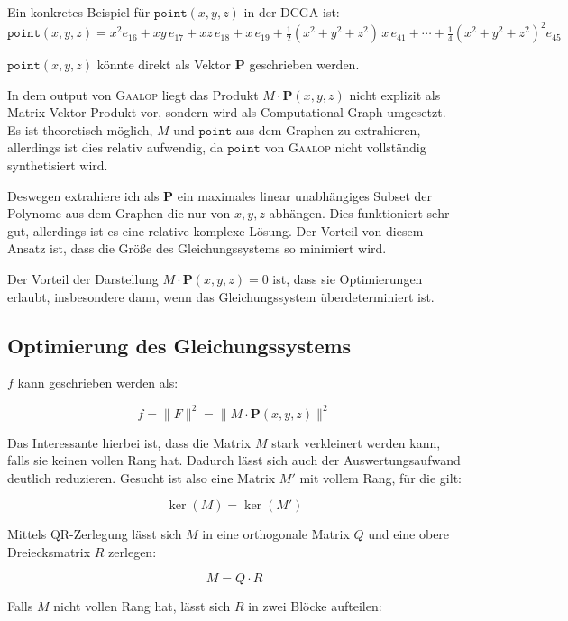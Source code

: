 \documentclass[
	ngerman,%
	accentcolor=9c,%
	ruledheaders=section,%
	class=report,%
	thesis={type=bachelor},%
	fontsize=11pt,%
	parskip=half-,%
	custommargins=true,%
	marginpar=false,%
]{tudapub}
\begin{document}

Ein konkretes Beispiel für \(\texttt{point}(x,y,z)\) in der DCGA ist:
\[
\texttt{point}(x,y,z) = x^2 e_{16} + xy\, e_{17} + xz\, e_{18} + x\, e_{19} + \tfrac{1}{2}(x^2 + y^2 + z^2)\, x\, e_{41} + \cdots + \tfrac{1}{4}(x^2 + y^2 + z^2)^2 e_{45}
\]

$\texttt{point}(x,y,z)$ könnte direkt als Vektor \(\mathbf{P}\) geschrieben werden.


In dem output von \textsc{Gaalop} liegt das Produkt $M \cdot  \mathbf{P}(x,y,z)$ nicht explizit als Matrix-Vektor-Produkt vor, sondern wird als Computational Graph umgesetzt. Es ist theoretisch möglich, $M$ und 
$\texttt{point}$ aus dem Graphen zu extrahieren, allerdings ist dies relativ aufwendig, da $\texttt{point}$ von \textsc{Gaalop} nicht vollständig synthetisiert wird.

Deswegen extrahiere ich als \(\mathbf{P}\) ein maximales linear unabhängiges Subset der Polynome aus dem Graphen die nur von \(x,y,z\) abhängen. Dies funktioniert sehr gut, allerdings ist es eine relative komplexe Lösung. Der Vorteil von diesem Ansatz ist, dass die Größe des Gleichungssystems so minimiert wird.

Der Vorteil der Darstellung $M \cdot  \mathbf{P}(x,y,z) = 0$ ist, dass sie Optimierungen erlaubt, insbesondere dann, wenn das Gleichungssystem überdeterminiert ist.
\subsection{Optimierung des Gleichungssystems}

\( f \) kann geschrieben werden als:

\[
f = \|F\|^2 = \|M \cdot  \mathbf{P}(x, y, z)\|^2
\]

Das Interessante hierbei ist, dass die Matrix \( M \) stark verkleinert werden kann, falls sie keinen vollen Rang hat. Dadurch lässt sich auch der Auswertungsaufwand deutlich reduzieren. Gesucht ist also eine Matrix \( M' \) mit vollem Rang, für die gilt:

\[
\ker(M) = \ker(M')
\]

Mittels QR-Zerlegung lässt sich \( M \) in eine orthogonale Matrix \( Q \) und eine obere Dreiecksmatrix \( R \) zerlegen:

\[
M = Q \cdot R
\]

Falls \( M \) nicht vollen Rang hat, lässt sich \( R \) in zwei Blöcke aufteilen:
\end{document}
